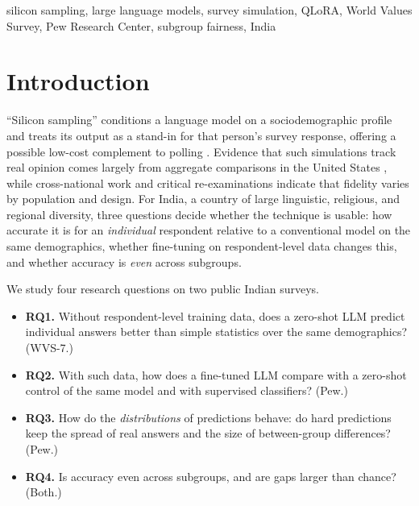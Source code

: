 \documentclass[conference]{IEEEtran}
\begin{document}
\begin{IEEEkeywords}
silicon sampling, large language models, survey simulation, QLoRA, World Values Survey, Pew Research Center, subgroup fairness, India
\end{IEEEkeywords}

\section{Introduction}

``Silicon sampling'' conditions a language model on a sociodemographic profile and treats its output as a stand-in for that person's survey response, offering a possible low-cost complement to polling \cite{argyle2023}. Evidence that such simulations track real opinion comes largely from aggregate comparisons in the United States \cite{argyle2023,santurkar2023}, while cross-national work \cite{durmus2023} and critical re-examinations \cite{bisbee2024} indicate that fidelity varies by population and design. For India, a country of large linguistic, religious, and regional diversity, three questions decide whether the technique is usable: how accurate it is for an \emph{individual} respondent relative to a conventional model on the same demographics, whether fine-tuning on respondent-level data changes this, and whether accuracy is \emph{even} across subgroups.

We study four research questions on two public Indian surveys.
\begin{itemize}
    \item \textbf{RQ1.} Without respondent-level training data, does a zero-shot LLM predict individual answers better than simple statistics over the same demographics? (WVS-7.)
    \item \textbf{RQ2.} With such data, how does a fine-tuned LLM compare with a zero-shot control of the same model and with supervised classifiers? (Pew.)
    \item \textbf{RQ3.} How do the \emph{distributions} of predictions behave: do hard predictions keep the spread of real answers and the size of between-group differences? (Pew.)
    \item \textbf{RQ4.} Is accuracy even across subgroups, and are gaps larger than chance? (Both.)
\end{itemize}
\end{document}
